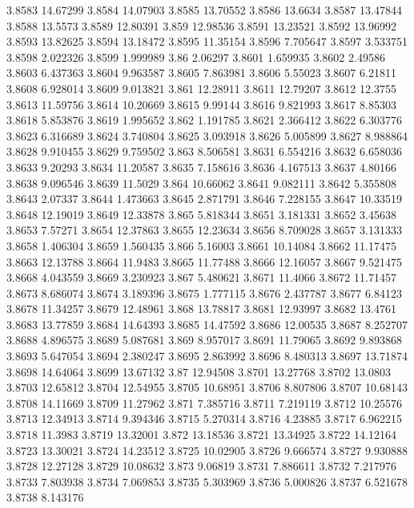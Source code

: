 3.8583  14.67299
3.8584  14.07903
3.8585  13.70552
3.8586  13.6634
3.8587  13.47844
3.8588  13.5573
3.8589  12.80391
3.859  12.98536
3.8591  13.23521
3.8592  13.96992
3.8593  13.82625
3.8594  13.18472
3.8595  11.35154
3.8596  7.705647
3.8597  3.533751
3.8598  2.022326
3.8599  1.999989
3.86  2.06297
3.8601  1.659935
3.8602  2.49586
3.8603  6.437363
3.8604  9.963587
3.8605  7.863981
3.8606  5.55023
3.8607  6.21811
3.8608  6.928014
3.8609  9.013821
3.861  12.28911
3.8611  12.79207
3.8612  12.3755
3.8613  11.59756
3.8614  10.20669
3.8615  9.99144
3.8616  9.821993
3.8617  8.85303
3.8618  5.853876
3.8619  1.995652
3.862  1.191785
3.8621  2.366412
3.8622  6.303776
3.8623  6.316689
3.8624  3.740804
3.8625  3.093918
3.8626  5.005899
3.8627  8.988864
3.8628  9.910455
3.8629  9.759502
3.863  8.506581
3.8631  6.554216
3.8632  6.658036
3.8633  9.20293
3.8634  11.20587
3.8635  7.158616
3.8636  4.167513
3.8637  4.80166
3.8638  9.096546
3.8639  11.5029
3.864  10.66062
3.8641  9.082111
3.8642  5.355808
3.8643  2.07337
3.8644  1.473663
3.8645  2.871791
3.8646  7.228155
3.8647  10.33519
3.8648  12.19019
3.8649  12.33878
3.865  5.818344
3.8651  3.181331
3.8652  3.45638
3.8653  7.57271
3.8654  12.37863
3.8655  12.23634
3.8656  8.709028
3.8657  3.131333
3.8658  1.406304
3.8659  1.560435
3.866  5.16003
3.8661  10.14084
3.8662  11.17475
3.8663  12.13788
3.8664  11.9483
3.8665  11.77488
3.8666  12.16057
3.8667  9.521475
3.8668  4.043559
3.8669  3.230923
3.867  5.480621
3.8671  11.4066
3.8672  11.71457
3.8673  8.686074
3.8674  3.189396
3.8675  1.777115
3.8676  2.437787
3.8677  6.84123
3.8678  11.34257
3.8679  12.48961
3.868  13.78817
3.8681  12.93997
3.8682  13.4761
3.8683  13.77859
3.8684  14.64393
3.8685  14.47592
3.8686  12.00535
3.8687  8.252707
3.8688  4.896575
3.8689  5.087681
3.869  8.957017
3.8691  11.79065
3.8692  9.893868
3.8693  5.647054
3.8694  2.380247
3.8695  2.863992
3.8696  8.480313
3.8697  13.71874
3.8698  14.64064
3.8699  13.67132
3.87  12.94508
3.8701  13.27768
3.8702  13.0803
3.8703  12.65812
3.8704  12.54955
3.8705  10.68951
3.8706  8.807806
3.8707  10.68143
3.8708  14.11669
3.8709  11.27962
3.871  7.385716
3.8711  7.219119
3.8712  10.25576
3.8713  12.34913
3.8714  9.394346
3.8715  5.270314
3.8716  4.23885
3.8717  6.962215
3.8718  11.3983
3.8719  13.32001
3.872  13.18536
3.8721  13.34925
3.8722  14.12164
3.8723  13.30021
3.8724  14.23512
3.8725  10.02905
3.8726  9.666574
3.8727  9.930888
3.8728  12.27128
3.8729  10.08632
3.873  9.06819
3.8731  7.886611
3.8732  7.217976
3.8733  7.803938
3.8734  7.069853
3.8735  5.303969
3.8736  5.000826
3.8737  6.521678
3.8738  8.143176
